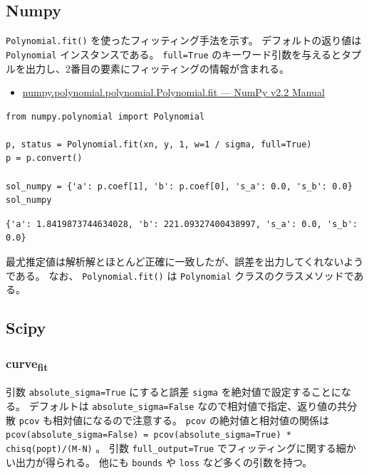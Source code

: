 \documentclass[a4paper, 8pt, notitlepage, uplatex, dvipdfmx]{jsarticle}
\begin{document}
\subsection{Numpy}
\label{sec:orgd972dc2}
\texttt{Polynomial.fit()} を使ったフィッティング手法を示す。
デフォルトの返り値は \texttt{Polynomial} インスタンスである。
\texttt{full=True} のキーワード引数を与えるとタプルを出力し、2番目の要素にフィッティングの情報が含まれる。
\begin{itemize}
\item \href{https://numpy.org/doc/stable/reference/generated/numpy.polynomial.polynomial.Polynomial.fit.html\#numpy.polynomial.polynomial.Polynomial.fit}{numpy.polynomial.polynomial.Polynomial.fit — NumPy v2.2 Manual}
\end{itemize}
\begin{verbatim}
from numpy.polynomial import Polynomial

p, status = Polynomial.fit(xn, y, 1, w=1 / sigma, full=True)
p = p.convert()

sol_numpy = {'a': p.coef[1], 'b': p.coef[0], 's_a': 0.0, 's_b': 0.0}
sol_numpy
\end{verbatim}

\label{}
\begin{verbatim}
{'a': 1.8419873744634028, 'b': 221.09327400438997, 's_a': 0.0, 's_b': 0.0}
\end{verbatim}

最尤推定値は解析解とほとんど正確に一致したが、誤差を出力してくれないようである。
なお、 \texttt{Polynomial.fit()} は \texttt{Polynomial} クラスのクラスメソッドである。
\subsection{Scipy}
\label{sec:orgae93679}
\subsubsection{curve\textsubscript{fit}}
\label{sec:org3933005}
引数 \texttt{absolute\_sigma=True} にすると誤差 \texttt{sigma} を絶対値で設定することになる。
デフォルトは \texttt{absolute\_sigma=False} なので相対値で指定、返り値の共分散 \texttt{pcov} も相対値になるので注意する。
\texttt{pcov} の絶対値と相対値の関係は \texttt{pcov(absolute\_sigma=False) = pcov(absolute\_sigma=True) * chisq(popt)/(M-N)} 。
引数 \texttt{full\_output=True} でフィッティングに関する細かい出力が得られる。
他にも \texttt{bounds} や \texttt{loss} など多くの引数を持つ。
\end{document}
